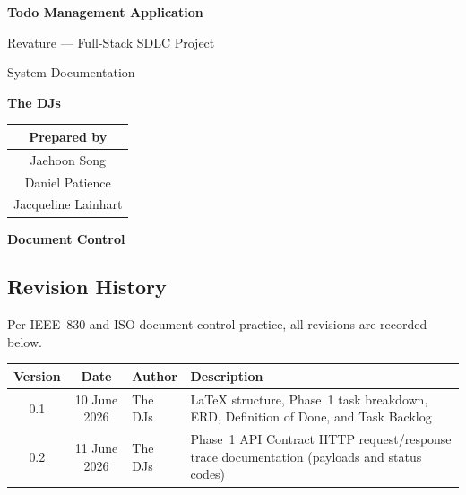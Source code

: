 
\thispagestyle{empty}
\begin{center}
  {\LARGE\bfseries Todo Management Application\par}
  \vspace{0.4cm}
  {\large Revature --- Full-Stack SDLC Project\par}
  \vspace{0.3cm}
  {\large System Documentation\par}
  \vspace{0.3cm}
  {\large\textbf{The DJs}\par}
\end{center}

\vspace{1cm}
\begin{center}
  \begin{tabular}{@{}c@{}}
    \toprule
    \textbf{Prepared by} \\
    \midrule
    Jaehoon Song \\
    Daniel Patience \\
    Jacqueline Lainhart \\
    \bottomrule
  \end{tabular}
\end{center}

\vspace{1.5cm}
\begin{center}
  {\large\bfseries Document Control}
\end{center}
\vspace{0.5cm}
\subsection*{Revision History}
Per IEEE~830 and ISO document-control practice, all revisions are recorded below.

\vspace{0.4cm}
\begin{tabularx}{\textwidth}{@{} c c l X @{}}
  \toprule
  \textbf{Version} & \textbf{Date} & \textbf{Author} & \textbf{Description} \\
  \midrule
  0.1 & 10 June 2026 & The DJs & LaTeX structure, Phase~1 task breakdown, ERD, Definition of Done, and Task Backlog \\
  0.2 & 11 June 2026 & The DJs & Phase~1 API Contract HTTP request/response trace documentation (payloads and status codes) \\
  \bottomrule
\end{tabularx}
 
